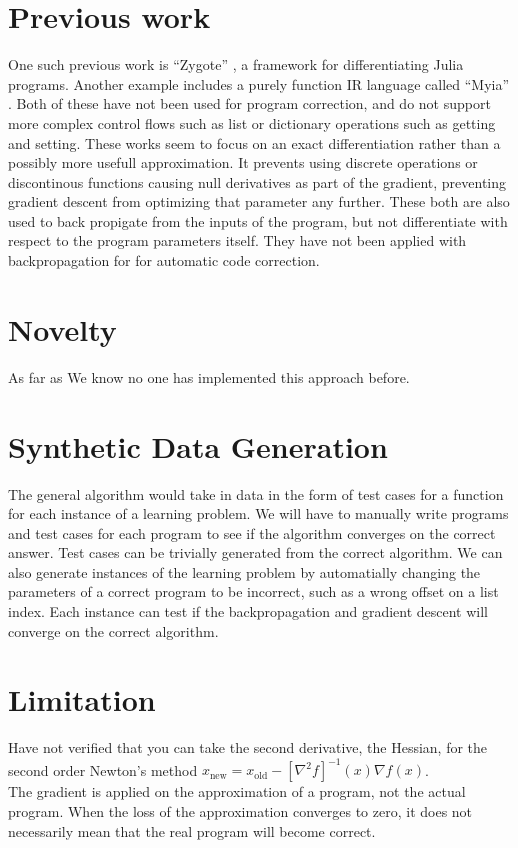 \documentclass{article}
\begin{document}
\section*{Previous work}
One such previous work is ``Zygote'' \cite{DBLP:journals/corr/abs-1907-07587}, a framework for differentiating Julia programs. Another example includes a purely function IR language called ``Myia'' \cite{DBLP:journals/corr/abs-1810-11530}. Both of these have not been used for program correction, and do not support more complex control flows such as list or dictionary operations such as getting and setting. These works seem to focus on an exact differentiation rather than a possibly more usefull approximation. It prevents using discrete operations or discontinous functions causing null derivatives as part of the gradient, preventing gradient descent from optimizing that parameter any further. These both are also used to back propigate from the inputs of the program, but not differentiate with respect to the program parameters itself. They have not been applied with backpropagation for for automatic code correction.
\section*{Novelty}
As far as We know no one has implemented this approach before.
\section*{Synthetic Data Generation}
The general algorithm would take in data in the form of test cases for a function for each instance of a learning problem. We will have to manually write programs and test cases for each program to see if the algorithm converges on the correct answer. Test cases can be trivially generated from the correct algorithm. We can also generate instances of the learning problem by automatially changing the parameters of a correct program to be incorrect, such as a wrong offset on a list index. Each instance can test if the backpropagation and gradient descent will converge on the correct algorithm.
\section*{Limitation}
Have not verified that you can take the second derivative, the Hessian, for the second order Newton's method $x_{\mathrm{new}} = x_{\mathrm{old}} - [\nabla^2 f]^{-1}(x) \nabla f(x)$.\\
The gradient is applied on the approximation of a program, not the actual program. When the loss of the approximation converges to zero, it does not necessarily mean that the real program will become correct.


\end{document}
